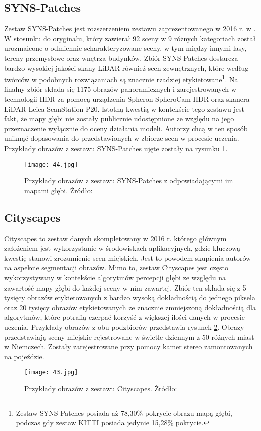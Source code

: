 \subsection{SYNS-Patches}
Zestaw SYNS-Patches \cite{spencer2022deconstructing} jest rozszerzeniem zestawu zaprezentowanego w 2016 r. w \cite{adams2016syns}. W stosunku do oryginału, który zawierał 92 sceny w 9 różnych kategoriach został urozmaicone o odmiennie scharakteryzowane sceny, w tym między innymi lasy, tereny przemysłowe oraz wnętrza budynków. Zbiór SYNS-Patches dostarcza bardzo wysokiej jakości skany LiDAR również scen zewnętrznych, które według twórców w podobnych rozwiązaniach są znacznie rzadziej etykietowane\footnote{Zestaw SYNS-Patches posiada aż 78,30\% pokrycie obrazu mapą głębi, podczas gdy zestaw KITTI posiada jedynie 15,28\% pokrycie.}. Na finalny zbiór składa się 1175 obrazów panoramicznych i zarejestrowanych w technologii HDR za pomocą urządzenia Spheron SpheroCam HDR oraz skanera LiDAR Leica ScanStation P20. Istotną kwestią w kontekście tego zestawu jest fakt, że mapy głębi nie zostały publicznie udostępnione ze względu na jego przeznaczenie wyłącznie do oceny działania modeli. Autorzy chcą w ten sposób uniknąć dopasowania do przedstawionych w zbiorze scen w procesie uczenia. Przykłady obrazów z zestawu SYNS-Patches ujęte zostały na rysunku \ref{fig:syns-example}.
\begin{figure}[H]
    \centering
    \texttt{[image: 44.jpg]}
    \caption{Przykłady obrazów z zestawu SYNS-Patches z odpowiadającymi im mapami głębi. Źródło: \cite{spencer2022deconstructing}}
    \label{fig:syns-example}
\end{figure}

\subsection{Cityscapes}
Cityscapes \cite{cordts2016cityscapes} to zestaw danych skompletowany w 2016 r. którego głównym założeniem jest wykorzystanie w środowiskach aplikacyjnych, gdzie kluczową kwestię stanowi zrozumienie scen miejskich. Jest to powodem skupienia autorów na aspekcie segmentacji obrazów. Mimo to, zestaw Cityscapes jest często wykorzystywany w kontekście algorytmów percepcji głębi ze względu na zawartość mapy głębi do każdej sceny w nim zawartej. Zbiór ten składa się z 5 tysięcy obrazów etykietowanych z bardzo wysoką dokładnością do jednego piksela oraz 20 tysięcy obrazów etykietowanych ze znacznie zmniejszoną dokładnością dla algorytmów, które potrafią czerpać korzyść z większej ilości danych w procesie uczenia. Przykłady obrazów z obu podzbiorów przedstawia rysunek \ref{fig:cityscapes-example}. Obrazy przedstawiają sceny miejskie rejestrowane w świetle dziennym z 50 różnych miast w Niemczech. Zostały zarejestrowane przy pomocy kamer stereo zamontowanych na pojeździe.
\begin{figure}[H]
    \centering
    \texttt{[image: 43.jpg]}
    \caption{Przykłady obrazów z zestawu Cityscapes. Źródło: \cite{cordts2016cityscapes}}
    \label{fig:cityscapes-example}
\end{figure}

